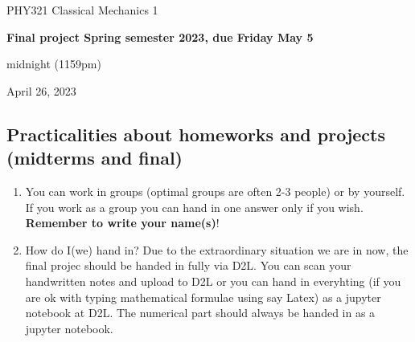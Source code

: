 \documentclass[%
oneside,                 %
final,                   %
10pt]{article}
\begin{document}

\newcommand{\exercisesection}[1]{\subsection*{#1}}






\thispagestyle{empty}

\begin{center}
{\LARGE\bf
\begin{spacing}{1.25}
PHY321 Classical Mechanics 1
\end{spacing}
}
\end{center}


\begin{center}
{\bf Final  project Spring semester 2023, due Friday May 5}
\end{center}

    \begin{center}
\centerline{{\small midnight (1159pm)}}
\end{center}
    

\begin{center}
April 26, 2023
\end{center}

\vspace{1cm}


\subsection*{Practicalities about  homeworks and projects (midterms and final)}

\begin{enumerate}
\item You can work in groups (optimal groups are often 2-3 people) or by yourself. If you work as a group you can hand in one answer only if you wish. \textbf{Remember to write your name(s)}!

\item How do I(we)  hand in?  Due to the extraordinary situation we are in now, the final projec should be handed in fully via D2L. You can scan your handwritten notes and upload to D2L or you can hand in everyhting (if you are ok with typing mathematical formulae using say Latex) as a jupyter notebook at D2L. The numerical part should always be handed in as a jupyter notebook.
\end{enumerate}
\end{document}
